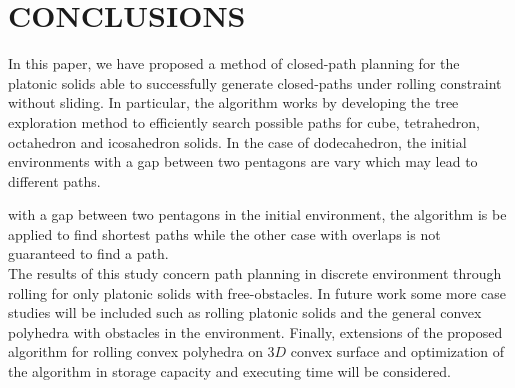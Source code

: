 \section{CONCLUSIONS}
%
\noindent In this paper, we have proposed a method of closed-path planning for the platonic solids able to successfully generate closed-paths under rolling constraint without sliding. 
%
In particular, the algorithm works by developing the tree exploration method to efficiently search possible paths for cube, tetrahedron, octahedron and icosahedron solids. 
%
In the case of dodecahedron, the initial environments with a gap between two pentagons are vary which may lead to different paths.

 with a gap between two pentagons in the initial environment, the algorithm is be applied to find shortest paths while the other case with overlaps is not guaranteed to find a path.\\


\noindent The results of this study concern path planning in discrete environment through rolling for only platonic solids with free-obstacles.
In future work some more case studies will be included such as rolling platonic solids and the general convex polyhedra with obstacles in the environment. 
Finally, extensions of the proposed algorithm for rolling convex polyhedra on $3D$ convex surface and optimization of the algorithm in storage capacity and executing time will be considered.\\

